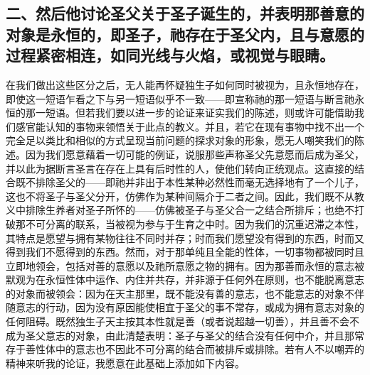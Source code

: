 \subsection{二、然后他讨论圣父关于圣子诞生的，并表明那善意的对象是永恒的，即圣子，祂存在于圣父内，且与意愿的过程紧密相连，如同光线与火焰，或视觉与眼睛。}

在我们做出这些区分之后，无人能再怀疑独生子如何同时被视为，且永恒地存在，即使这一短语乍看之下与另一短语似乎不一致——即宣称祂的那一短语与断言祂永恒的那一短语。但若我们要以进一步的论证来证实我们的陈述，则或许可能借助我们感官能认知的事物来领悟关于此点的教义。并且，若它在现有事物中找不出一个完全足以类比和相似的方式呈现当前问题的探求对象的形象，愿无人嘲笑我们的陈述。因为我们愿意藉着一切可能的例证，说服那些声称圣父先意愿而后成为圣父，并以此为据断言圣言在存在上具有后时性的人，使他们转向正统观点。这直接的结合既不排除圣父的——即祂并非出于本性某种必然性而毫无选择地有了一个儿子，这也不将圣子与圣父分开，仿佛作为某种间隔介于二者之间。因此，我们既不从教义中排除生养者对圣子所怀的——仿佛被圣子与圣父合一之结合所排斥；也绝不打破那不可分离的联系，当被视为参与于生育之中时。因为我们的沉重迟滞之本性，其特点是愿望与拥有某物往往不同时并存；时而我们愿望没有得到的东西，时而又得到我们不愿得到的东西。然而，对于那单纯且全能的性体，一切事物都被同时且立即地领会，包括对善的意愿以及祂所意愿之物的拥有。因为那善而永恒的意志被默观为在永恒性体中运作、内住并共存，并非源于任何外在原则，也不能脱离意志的对象而被领会：因为在天主那里，既不能没有善的意志，也不能意志的对象不伴随意志的行动，因为没有原因能使相宜于圣父的事不常存，或成为拥有意志对象的任何阻碍。既然独生子天主按其本性就是善（或者说超越一切善），并且善不会不成为圣父意志的对象，由此清楚表明：圣子与圣父的结合没有任何中介，并且那常存于善性体中的意志也不因此不可分离的结合而被排斥或排除。若有人不以嘲弄的精神来听我的论证，我愿意在此基础上添加如下内容。\par

